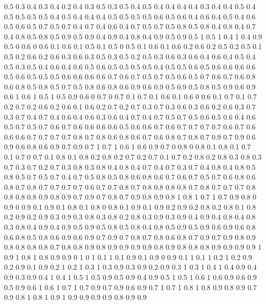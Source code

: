 0.5 0.3
0.4 0.3
0.4 0.2
0.4 0.3
0.5 0.3
0.5 0.4
0.5 0.4
0.4 0.4
0.4 0.3
0.4 0.4
0.5 0.4
0.5 0.5
0.5 0.5
0.4 0.5
0.4 0.4
0.4 0.5
0.5 0.5
0.5 0.6
0.5 0.6
0.4 0.6
0.4 0.5
0.4 0.6
0.5 0.6
0.5 0.7
0.5 0.7
0.4 0.7
0.4 0.6
0.4 0.7
0.5 0.7
0.5 0.8
0.5 0.8
0.4 0.8
0.4 0.7
0.4 0.8
0.5 0.8
0.5 0.9
0.5 0.9
0.4 0.9
0.4 0.8
0.4 0.9
0.5 0.9
0.5 1
0.5 1
0.4 1
0.4 0.9
0.5 0
0.6 0
0.6 0.1
0.6 0.1
0.5 0.1
0.5 0
0.5 0.1
0.6 0.1
0.6 0.2
0.6 0.2
0.5 0.2
0.5 0.1
0.5 0.2
0.6 0.2
0.6 0.3
0.6 0.3
0.5 0.3
0.5 0.2
0.5 0.3
0.6 0.3
0.6 0.4
0.6 0.4
0.5 0.4
0.5 0.3
0.5 0.4
0.6 0.4
0.6 0.5
0.6 0.5
0.5 0.5
0.5 0.4
0.5 0.5
0.6 0.5
0.6 0.6
0.6 0.6
0.5 0.6
0.5 0.5
0.5 0.6
0.6 0.6
0.6 0.7
0.6 0.7
0.5 0.7
0.5 0.6
0.5 0.7
0.6 0.7
0.6 0.8
0.6 0.8
0.5 0.8
0.5 0.7
0.5 0.8
0.6 0.8
0.6 0.9
0.6 0.9
0.5 0.9
0.5 0.8
0.5 0.9
0.6 0.9
0.6 1
0.6 1
0.5 1
0.5 0.9
0.6 0
0.7 0
0.7 0.1
0.7 0.1
0.6 0.1
0.6 0
0.6 0.1
0.7 0.1
0.7 0.2
0.7 0.2
0.6 0.2
0.6 0.1
0.6 0.2
0.7 0.2
0.7 0.3
0.7 0.3
0.6 0.3
0.6 0.2
0.6 0.3
0.7 0.3
0.7 0.4
0.7 0.4
0.6 0.4
0.6 0.3
0.6 0.4
0.7 0.4
0.7 0.5
0.7 0.5
0.6 0.5
0.6 0.4
0.6 0.5
0.7 0.5
0.7 0.6
0.7 0.6
0.6 0.6
0.6 0.5
0.6 0.6
0.7 0.6
0.7 0.7
0.7 0.7
0.6 0.7
0.6 0.6
0.6 0.7
0.7 0.7
0.7 0.8
0.7 0.8
0.6 0.8
0.6 0.7
0.6 0.8
0.7 0.8
0.7 0.9
0.7 0.9
0.6 0.9
0.6 0.8
0.6 0.9
0.7 0.9
0.7 1
0.7 1
0.6 1
0.6 0.9
0.7 0
0.8 0
0.8 0.1
0.8 0.1
0.7 0.1
0.7 0
0.7 0.1
0.8 0.1
0.8 0.2
0.8 0.2
0.7 0.2
0.7 0.1
0.7 0.2
0.8 0.2
0.8 0.3
0.8 0.3
0.7 0.3
0.7 0.2
0.7 0.3
0.8 0.3
0.8 0.4
0.8 0.4
0.7 0.4
0.7 0.3
0.7 0.4
0.8 0.4
0.8 0.5
0.8 0.5
0.7 0.5
0.7 0.4
0.7 0.5
0.8 0.5
0.8 0.6
0.8 0.6
0.7 0.6
0.7 0.5
0.7 0.6
0.8 0.6
0.8 0.7
0.8 0.7
0.7 0.7
0.7 0.6
0.7 0.7
0.8 0.7
0.8 0.8
0.8 0.8
0.7 0.8
0.7 0.7
0.7 0.8
0.8 0.8
0.8 0.9
0.8 0.9
0.7 0.9
0.7 0.8
0.7 0.9
0.8 0.9
0.8 1
0.8 1
0.7 1
0.7 0.9
0.8 0
0.9 0
0.9 0.1
0.9 0.1
0.8 0.1
0.8 0
0.8 0.1
0.9 0.1
0.9 0.2
0.9 0.2
0.8 0.2
0.8 0.1
0.8 0.2
0.9 0.2
0.9 0.3
0.9 0.3
0.8 0.3
0.8 0.2
0.8 0.3
0.9 0.3
0.9 0.4
0.9 0.4
0.8 0.4
0.8 0.3
0.8 0.4
0.9 0.4
0.9 0.5
0.9 0.5
0.8 0.5
0.8 0.4
0.8 0.5
0.9 0.5
0.9 0.6
0.9 0.6
0.8 0.6
0.8 0.5
0.8 0.6
0.9 0.6
0.9 0.7
0.9 0.7
0.8 0.7
0.8 0.6
0.8 0.7
0.9 0.7
0.9 0.8
0.9 0.8
0.8 0.8
0.8 0.7
0.8 0.8
0.9 0.8
0.9 0.9
0.9 0.9
0.8 0.9
0.8 0.8
0.8 0.9
0.9 0.9
0.9 1
0.9 1
0.8 1
0.8 0.9
0.9 0
1 0
1 0.1
1 0.1
0.9 0.1
0.9 0
0.9 0.1
1 0.1
1 0.2
1 0.2
0.9 0.2
0.9 0.1
0.9 0.2
1 0.2
1 0.3
1 0.3
0.9 0.3
0.9 0.2
0.9 0.3
1 0.3
1 0.4
1 0.4
0.9 0.4
0.9 0.3
0.9 0.4
1 0.4
1 0.5
1 0.5
0.9 0.5
0.9 0.4
0.9 0.5
1 0.5
1 0.6
1 0.6
0.9 0.6
0.9 0.5
0.9 0.6
1 0.6
1 0.7
1 0.7
0.9 0.7
0.9 0.6
0.9 0.7
1 0.7
1 0.8
1 0.8
0.9 0.8
0.9 0.7
0.9 0.8
1 0.8
1 0.9
1 0.9
0.9 0.9
0.9 0.8
0.9 0.9
